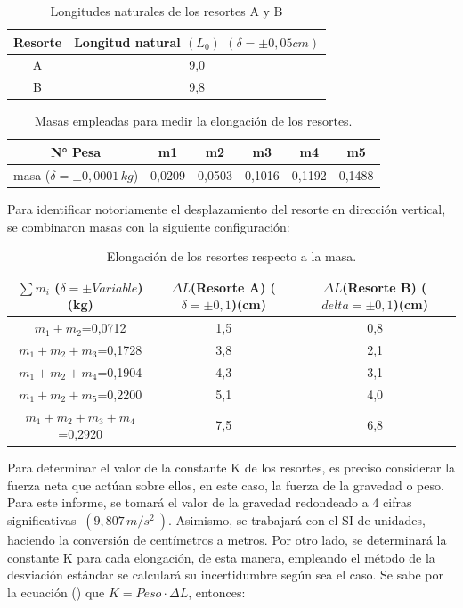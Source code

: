 \documentclass[../main.tex]{subfiles}
\begin{document}
\begin{table}[H]
    \centering
    \begin{tabular}{c | c}
        \hline
        Resorte & Longitud natural $(L_0)$ $(\delta=\pm 0,05 cm)$\\
        \hline
        A	    & 9,0\\
        B	    & 9,8\\
        \hline
    \end{tabular}
    \label{ref:tab1}
    \caption{Longitudes naturales de los resortes A y B}
\end{table}
\begin{table}[H]
    \centering
    \begin{tabular}{c|c|c|c|c|c}
        \hline
        N° Pesa &	m1 & m2 & m3& m4 &m5\\
        \hline
        masa ($\delta = \pm 0,0001 \, kg$) & 0,0209 & 0,0503 & 0,1016 & 0,1192 & 0,1488 \\
        \hline
    \end{tabular}
    \label{ref:tab2}
    \caption{Masas empleadas para medir la elongación de los resortes.}
\end{table}

Para identificar notoriamente el desplazamiento del resorte en dirección vertical, se combinaron masas con la siguiente configuración:

\begin{table}[H]
    \centering
    \begin{tabular}{c | c | c}
        \hline
        $\sum m_i$ ($\delta=\pm Variable$)(kg) &$\Delta L$(Resorte A) ($\delta=\pm 0,1$)(cm) &	$\Delta L$(Resorte B)  ($delta=\pm 0,1$)(cm)\\
        \hline
        $m_1+m_2$=0,0712	        & 1,5	& 0,8 \\
        $m_1+m_2+m_3$=0,1728	    & 3,8	& 2,1\\
        $m_1+m_2+m_4$=0,1904	    & 4,3	& 3,1\\
        $m_1+m_2+m_5$=0,2200	    & 5,1	& 4,0\\
        $m_1+m_2+m_3+m_4$=0,2920	& 7,5	& 6,8\\

        \hline
    \end{tabular}
    \label{ref:tab3}
    \caption{Elongación de los resortes respecto a la masa.}
\end{table}

Para determinar el valor de la constante K de los resortes, es preciso considerar la
fuerza neta que actúan sobre ellos, en este caso, la fuerza de la gravedad o peso.
Para este informe, se tomará el valor de la gravedad redondeado a 4 cifras 
significativas $\ (9,807 \, m/s^2\ )$. Asimismo, se trabajará con el SI
de unidades, haciendo la conversión de centímetros a metros. Por otro lado, se determinará 
la constante K para cada elongación, de esta manera, empleando el método de la 
desviación estándar se calculará su incertidumbre según sea el caso.
Se sabe por la ecuación () que $ K = Peso \cdot \Delta L$, entonces:
\end{document}
